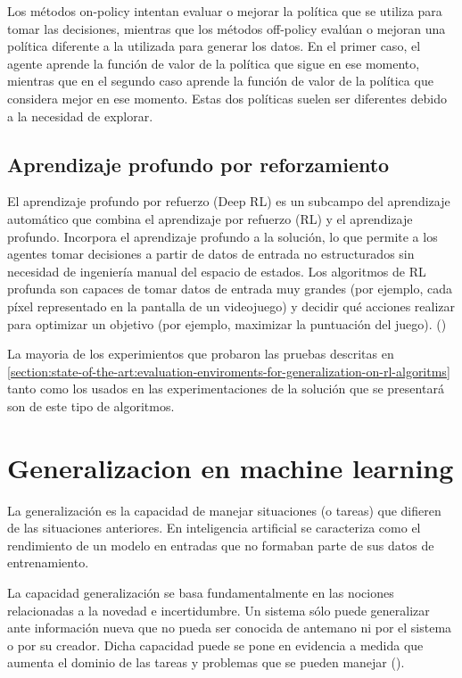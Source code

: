 Los métodos on-policy intentan evaluar o mejorar la política que se utiliza para tomar las decisiones, mientras que los métodos off-policy evalúan o mejoran una política diferente a la utilizada para generar los datos. En el primer caso, el agente aprende la función de valor de la política que sigue en ese momento, mientras que en el segundo caso aprende la función de valor de la política que considera mejor en ese momento. Estas dos políticas suelen ser diferentes debido a la necesidad de explorar.

\subsection{Aprendizaje profundo por reforzamiento}

El aprendizaje profundo por refuerzo (Deep RL) es un subcampo del aprendizaje automático que combina el aprendizaje por refuerzo (RL) y el aprendizaje profundo. Incorpora el aprendizaje profundo a la solución, lo que permite a los agentes tomar decisiones a partir de datos de entrada no estructurados sin necesidad de ingeniería manual del espacio de estados. Los algoritmos de RL profunda son capaces de tomar datos de entrada muy grandes (por ejemplo, cada píxel representado en la pantalla de un videojuego) y decidir qué acciones realizar para optimizar un objetivo (por ejemplo, maximizar la puntuación del juego). (\cite{franccois2018introduction})

La mayoria de los experimientos que probaron las pruebas descritas en \ref{section:state-of-the-art:evaluation-enviroments-for-generalization-on-rl-algoritms} tanto como los usados en las experimentaciones de la solución que se presentará son de este tipo de algoritmos.

\section{Generalizacion en machine learning}\label{section:state-of-the-art:generalization-on-machine-learning}

La generalización es la capacidad de manejar situaciones (o tareas) que difieren de las situaciones anteriores. En inteligencia artificial se caracteriza como el rendimiento de un modelo en entradas que no formaban parte de sus datos de entrenamiento.

La capacidad generalización se basa fundamentalmente en las nociones relacionadas a la novedad e incertidumbre. Un sistema sólo puede generalizar ante información nueva que no pueda ser conocida de antemano ni por el sistema o por su creador. Dicha capacidad puede se pone en evidencia a medida que aumenta el dominio de las tareas y problemas que se pueden manejar (\cite{chollet2019measure}).

